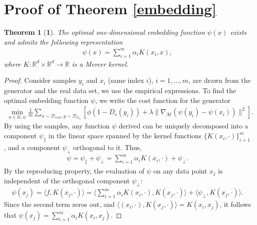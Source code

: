 \documentclass[10pt,twocolumn,letterpaper]{article}
\newcommand{\g}{{G_u}}
\newcommand{\di}{{D_v}}
\newcommand{\U}{\mathcal{U}}
\newcommand{\D}{\mathcal{D}}
\newcommand{\M}{\mathcal{M}}
\newtheorem*{thm*}{Theorem}
\begin{document}
\section{Proof of Theorem \ref{embedding}}
\begin{thm*}[\bf 1]
	The optimal one-dimensional embedding function $\psi(x)$ exists and admits the following representation
	\begin{align}
	\psi(x)=\sum_{i=1}^{m}\alpha_i K(x_i,x),
	\end{align}
	where $K: \mathbb{R}^d \times \mathbb{R}^d \rightarrow \mathbb{R}$ is a Mercer kernel.
\end{thm*}
\begin{proof}
	Consider samples $y_i$ and $x_i$ (same index $i$), $i=1,\ldots,m$, are drawn from the generator and the real data set, we use the empirical expressions. To find the optimal embedding function $\psi$, we write the cost function for the generator
	\begin{align}\label{emp_cost_gen_embd1}
	\min_{u\in \U, \psi}  \frac{1}{m}\sum_{x\sim \D_{real},y\sim \D_{\g}} [\phi(1-\di(y_i))
	+\lambda \|\nabla_\M (\psi(y_i)-\psi(x_i))\|^2].
	\end{align}
	By using the samples, any function $\psi$ derived can be uniquely decomposed into a component $\psi_{\parallel}$ in the linear space spanned by the kernel functions $\{K(x_i,\cdot)\}_{i=1}^{m}$, and a component $\psi_\perp$ orthogonal to it. Thus,
	\begin{align}
	\psi = \psi_{\parallel}+ \psi_\perp = \sum_{i=1}^{m}\alpha_i K(x_i,\cdot) + \psi_\perp.
	\end{align}
	By the reproducing property, the evaluation of $\psi$ on any data point $x_j$ is independent of the orthogonal component $\psi_\perp$:
	\begin{align}
	\psi(x_j) = \langle f, K(x_j,\cdot)\rangle = \langle \sum_{i=1}^{m}\alpha_i K(x_i,\cdot), K(x_j,\cdot)\rangle + \langle \psi_\perp, K(x_j,\cdot)\rangle.
	\end{align}
	Since the second term zeros out, and $\langle (x_i,\cdot), K(x_j,\cdot)\rangle = K(x_i,x_j)$, it follows that $\psi(x_j) = \sum_{i=1}^{m}\alpha_i K(x_i,x_j)$.
	

\end{proof}
\end{document}
